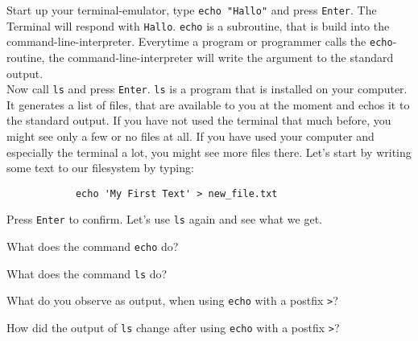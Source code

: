 \begin{challenge}
    \begin{task}
        Start up your terminal-emulator, type \texttt{echo "Hallo"} and press \texttt{Enter}.
        The Terminal will respond with \texttt{Hallo}.
        \texttt{echo} is a subroutine, that is build into the command-line-interpreter.
        Everytime a program or programmer calls the \texttt{echo}-routine, the command-line-interpreter will write the argument to the standard output.\\
        Now call \texttt{ls} and press \texttt{Enter}.
        \texttt{ls} is a program that is installed on your computer.
        It generates a list of files, that are available to you at the moment and echos it to the standard output.
        If you have not used the terminal that much before, you might see only a few or no files at all. 
        If you have used your computer and especially the terminal a lot, you might see more files there. 
        Let's start by writing some text to our filesystem by typing:
        \begin{lstlisting}
            echo 'My First Text' > new_file.txt 
        \end{lstlisting}
        Press \texttt{Enter} to confirm.
        Let's use \texttt{ls} again and see what we get.

        \begin{quesitons}
            \item What does the command \texttt{echo} do?
            \item What does the command \texttt{ls} do?
            \item What do you observe as output, when using \texttt{echo} with a postfix \texttt{>}?
            \item How did the output of \texttt{ls} change after using \texttt{echo} with a postfix \texttt{>}?
        \end{quesitons}
    \end{task}


\end{challenge}
